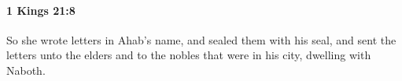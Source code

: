 
		\paragraph{1 Kings 21:8} %
			\label{1KINGS-21-8}

			So she wrote letters in Ahab’s name, and sealed them with his seal, and sent the letters unto the elders and to the nobles that were in his city, dwelling with Naboth.



